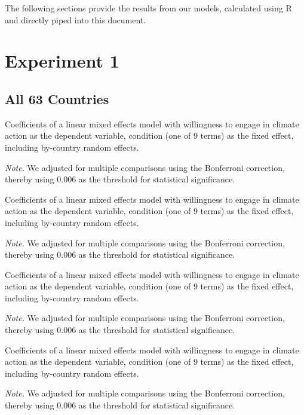 The following sections provide the results from our models, calculated using R and directly piped into this document.

        \section{Experiment 1}

    \subsection{All 63 Countries}


\begin{table}[H] 
\caption{Coefficients of a linear mixed effects model with willingness to engage in climate action as the dependent variable, condition (one of 9 terms) as the fixed effect, including by-country random effects.}
 
\end{table}
\textit{Note.} We adjusted for multiple comparisons using the Bonferroni correction, thereby using 0.006 as the threshold for statistical significance.

\begin{table}[H] 
\caption{Coefficients of a linear mixed effects model with willingness to engage in climate action as the dependent variable, condition (one of 9 terms) as the fixed effect, including by-country random effects.}
 
\end{table}
\textit{Note.} We adjusted for multiple comparisons using the Bonferroni correction, thereby using 0.006 as the threshold for statistical significance.

\begin{table}[H] 
\caption{Coefficients of a linear mixed effects model with willingness to engage in climate action as the dependent variable, condition (one of 9 terms) as the fixed effect, including by-country random effects.}
 
\end{table}
\textit{Note.} We adjusted for multiple comparisons using the Bonferroni correction, thereby using 0.006 as the threshold for statistical significance.

\begin{table}[H] 
\caption{Coefficients of a linear mixed effects model with willingness to engage in climate action as the dependent variable, condition (one of 9 terms) as the fixed effect, including by-country random effects.}
 
\end{table}
\textit{Note.} We adjusted for multiple comparisons using the Bonferroni correction, thereby using 0.006 as the threshold for statistical significance.

